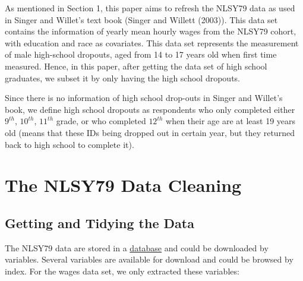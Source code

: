 \documentclass{article}
\begin{document}
As mentioned in Section 1, this paper aims to refresh the NLSY79 data as used in Singer and Willet's text book (Singer and Willett (2003)). This data set contains the information of yearly mean hourly wages from the NLSY79 cohort, with education and race as covariates. This data set represents the measurement of male high-school dropouts, aged from 14 to 17 years old when first time measured. Hence, in this paper, after getting the data set of high school graduates, we subset it by only having the high school dropouts.

Since there is no information of high school drop-outs in Singer and Willet's book, we define high school dropouts as respondents who only completed either \(9^{th}\), \(10^{th}\), \(11^{th}\) grade, or who completed \(12^{th}\) when their age are at least 19 years old (means that these IDs being dropped out in certain year, but they returned back to high school to complete it).

\hypertarget{the-nlsy79-data-cleaning}{%
\section{The NLSY79 Data Cleaning}\label{the-nlsy79-data-cleaning}}

\hypertarget{getting-and-tidying-the-data}{%
\subsection{Getting and Tidying the Data}\label{getting-and-tidying-the-data}}

The NLSY79 data are stored in a \href{https://www.nlsinfo.org/content/cohorts/nlsy79/get-data}{database} and could be downloaded by variables. Several variables are available for download and could be browsed by index. For the wages data set, we only extracted these variables:
\end{document}
